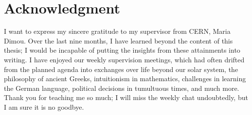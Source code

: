 \section*{Acknowledgment}

I want to express my sincere gratitude to my supervisor from CERN, Maria Dimou. Over the last nine months, I have learned beyond the content of this thesis; I would be incapable of putting the insights from these attainments into writing. I have enjoyed our weekly supervision meetings, which had often drifted from the planned agenda into exchanges over life beyond our solar system, the philosophy of ancient Greeks, intuitionism in mathematics, challenges in learning the German language, political decisions in tumultuous times, and much more. Thank you for teaching me so much; I will miss the weekly chat undoubtedly, but I am sure it is no goodbye.
